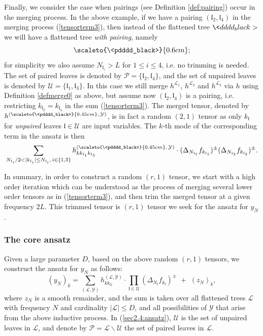 \documentclass[11 pt,reqno]{amsart}
\theoremstyle{definition}
\theoremstyle{remark}
\numberwithin{equation}{section}
\newcommand{\Lc}{\mathcal{L}}
\newcommand{\Pc}{\mathcal{P}}
\newcommand{\Uc}{\mathcal{U}}
\newcommand{\Yc}{\mathcal{Y}}
\newcommand{\lf}{\mathfrak{l}}
\begin{document}
{Finally, we consider the case when pairings (see Definition \ref{def:pairing}) occur in the merging process. In the above example, if we have a pairing $(\lf_2,\lf_4)$ in the merging process (\ref{tensorterm3}), then instead of the flattened tree $\<dddd_black>$ we will have a flattened tree \emph{with pairing}, namely\[\scaleto{\<pdddd_black>}{0.6cm};\] for simplicity we also assume $N_{\lf_i}>L$ for $1\leq i\leq 4$, i.e. no trimming is needed. The set of paired leaves is denoted by $\Pc =\{\lf_2, \lf_4\}$, and the set of  unpaired leaves is denoted by $\Uc =\{\lf_1,\lf_3\}$. In this case we still merge $h^{\Lc_1}$, $h^{\Lc_2}$ and $h^{\Lc_3}$ via $h$ using Definition \ref{defmerge0} as above, but assume now $(\lf_2, \lf_4)$ is a pairing, i.e. restricting $k_{\lf_2}=k_{\lf_4}$ in the sum (\ref{tensorterm3}). The merged tensor, denoted by $h^{({\scaleto{\<pdddd_black>}{0.45cm}},\,\Yc)}$, is in fact a random $(2,1)$ tensor as only $k_\lf$ for \emph{unpaired} leaves $\lf\in\Uc$ are input variables. The $k$-th mode of the corresponding term in the ansatz is then  \begin{equation}
\sum_{N_{\lf_i}/2<|k_{\lf_i}|\leq N_{\lf_i},\,i\in\{1,3\}}h^{({\scaleto{\<pdddd_black>}{0.45cm}},\,\Yc)}_{kk_{\lf_1}k_{\lf_3}}\cdot  (\Delta_{N_{\lf_1}}f_{k_{\lf_1}})^\pm (\Delta_{N_{\lf_3}}f_{k_{\lf_3}})^\pm.
\end{equation}

In summary, in order to construct a random $(r,1)$ tensor, we start with a high order iteration which can be understood as the process of merging several lower order tensors as in (\ref{tensorterm3}), and then trim the merged tensor at a given frequency $2L$. This trimmed tensor is $(r,1)$ tensor we seek for the ansatz for $y_N$.
\subsubsection{The core ansatz}\label{sec:2.4.3} Given a large parameter $D$, based on the above random $(r,1)$ tensors, we construct the ansatz for $y_N$ as follows:    
\begin{equation}\label{sec2.4:ansatz}
(y_N)_k = \sum_{(\Lc,\Yc)} h^{(\Lc,\Yc)}_{k k_\Uc}\cdot \prod_{\lf\in \Uc} (\Delta_{N_{\lf}}f_{k_{\lf}})^\pm   \, \, + \, \,  (z_N)_k,
\end{equation}
where $z_N$ is a smooth remainder, and the sum is taken over all flattened trees $\Lc$ with frequency $N$ and cardinality $|\Lc|\leq D$, and all possibilities of $\Yc$ that arise from the above inductive process. In (\ref{sec2.4:ansatz}), $\Uc$ is the set of unpaired leaves in $\Lc$, and denote by $\Pc =\Lc\backslash \Uc$ the set of paired leaves in $\Lc$.

}
\end{document}
